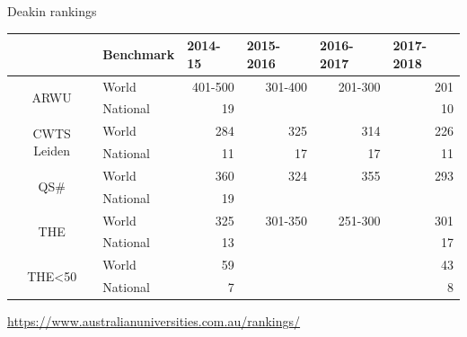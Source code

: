 \documentclass[
 size=14pt,
 paper=smartboard,  %
 mode=present, 		%
 display=slides, 	%
 style=tuliplab,  	%
 pauseslide,
 fleqn,leqno]{powerdot}
\begin{document}
\begin{slide}{Deakin rankings}
\begin{table}[htbp]
  \setlength{\abovecaptionskip}{-2pt}
  \setlength{\belowcaptionskip}{12pt}
  \centering
    \begin{tabular}{clrrrr}
    \toprule
      & Benchmark & \multicolumn{1}{l}{2014-15} & \multicolumn{1}{l}{2015-2016} & \multicolumn{1}{l}{2016-2017} & \multicolumn{1}{l}{2017-2018} \\ \midrule
    \multirow{2}[0]{*}{ARWU} & World & 401-500 & 301-400 & 201-300 & 201 \\
      & National  & 19 &   &   & 10 \\
      \midrule
    \multirow{2}[0]{*}{CWTS Leiden} & World  & 284 & 325 & 314 & 226 \\
      & National  & 11 & 17 & 17 & 11 \\
      \midrule
    \multirow{2}[0]{*}{QS\#} & World  & 360 & 324 & 355 & 293 \\
      & National & 19 &   &   &  \\
      \midrule
    \multirow{2}[0]{*}{THE} & World  & 325 & 301-350 & 251-300 & 301 \\
      & National  & 13 &   &   & 17 \\
      \midrule
    \multirow{2}[0]{*}{THE<50} & World  & 59 &   &   & 43 \\
      & National  & 7 &   &   & 8 \\
      \bottomrule
    \end{tabular}
  \label{tab:Deakin Ranking}
\end{table}
\centering
\url{https://www.australianuniversities.com.au/rankings/}
\end{slide}
\end{document}
